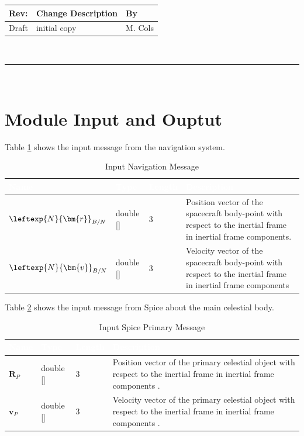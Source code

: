 \documentclass[]{AVSSimReportMemo}
\begin{document}
\makeCover


%
%
\pagestyle{empty}
{\renewcommand{\arraystretch}{2}
\noindent
\begin{longtable}{|p{0.5in}|p{4.5in}|p{1.14in}|}
\hline
{\bfseries Rev}: & {\bfseries Change Description} & {\bfseries By} \\
\hline
Draft & initial copy & M. Cols \\
\hline

\end{longtable}
}

\newpage
\setcounter{page}{1}
\pagestyle{fancy}

\tableofcontents
~\\ \hrule ~\\

\newpage
\section{Module Input and Ouptut}
Table \ref{tab:inputNavTable} shows the input message from the navigation system.
\begin{table}[h!]
	\centering
	\caption{Input Navigation Message}
	\begin{tabular}{|l|l|l|p{3in}|}
		\hline
		\rowcolor{BrickRed}
		\textcolor{white}{Name} & \textcolor{white}{Type} &
		\textcolor{white}{Length} &
		\textcolor{white}{Description}  \\ \hline
		$\leftexp{N}{\bm{r}}_{B/N}$ & double [] & 3 &
		Position vector of the spacecraft body-point with respect to the inertial frame in inertial frame components. \\ \hline
		$\leftexp{N}{\bm{v}}_{B/N}$ & double [] & 3 &
		Velocity vector of the spacecraft body-point with respect to the inertial frame in inertial frame components \\ \hline
	\end{tabular}
	\label{tab:inputNavTable}
\end{table}


Table \ref{tab:inputCelTable} shows the input message from Spice about the main celestial body.
\begin{table}[h!]
	\centering
	\caption{Input Spice Primary Message}
	\begin{tabular}{|l|l|l|p{3in}|}
		\hline
		\rowcolor{BrickRed}
		\textcolor{white}{Name} & \textcolor{white}{Type} &
		\textcolor{white}{Length} &
		\textcolor{white}{Description}  \\ \hline
		$\bm{R}_P$  & double [] & 3 &
		Position vector of the primary celestial object with respect to the inertial frame in inertial frame components . \\ \hline
		$\bm{v}_P$  & double [] & 3 &
		Velocity vector of the primary celestial object with respect to the inertial frame in inertial frame components . \\ \hline
	\end{tabular}
	\label{tab:inputCelTable}
\end{table}
\end{document}

